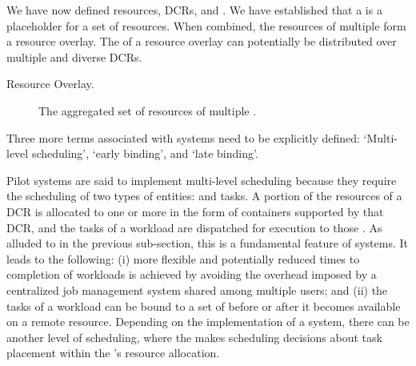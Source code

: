\documentclass{sig-alternate}
\begin{document}

We have now defined resources, DCRs, and \pilots. We have established that a
\pilot is a placeholder for a set of resources. When combined, the resources of
multiple \pilots form a resource overlay. The \pilots of a resource overlay can
potentially be distributed over multiple and diverse DCRs.


\begin{description}
\item[Resource Overlay.] The aggregated set of resources of multiple \pilots.
\end{description}

Three more terms associated with \pilot systems need to be explicitly defined:
`Multi-level scheduling', `early binding', and `late binding'.

Pilot systems are said to implement multi-level scheduling because they require
the scheduling of two types of entities: \pilots and tasks.  A portion of the resources of a DCR is allocated to one or
more \pilots in the form of containers supported by that DCR, and the tasks of a
workload are dispatched for execution to those \pilots. As alluded to in the
previous sub-section, this is a fundamental feature of \pilot systems.  It leads
to the following: (i) more flexible and potentially reduced times to completion
of workloads is achieved by avoiding the overhead imposed by a centralized job
management system shared among multiple users; and (ii) the tasks of a workload
can be bound to a set of \pilots before or after it becomes available on a
remote resource. Depending on the implementation of a \pilot system, there can
be another level of scheduling, where the \pilot makes scheduling decisions
about task placement within the \pilot's resource allocation.

\end{document}
